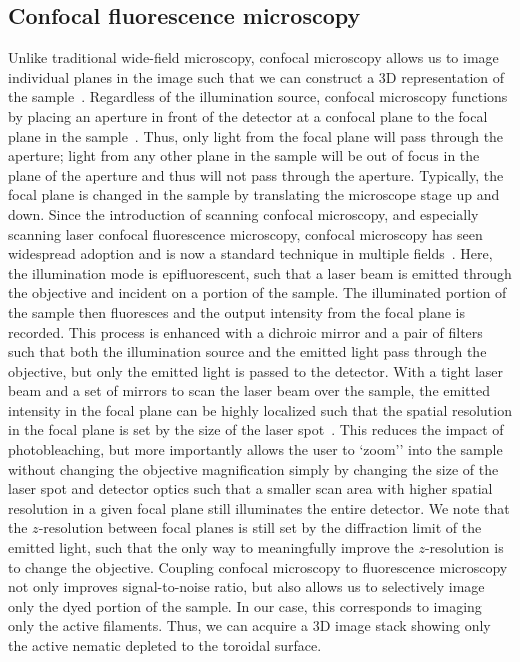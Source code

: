 \subsection{Confocal fluorescence microscopy}
Unlike traditional wide-field microscopy, confocal microscopy allows us to image individual planes in the image such that we can construct a 3D representation of the sample~\cite{RN260}.
Regardless of the illumination source, confocal microscopy functions by placing an aperture in front of the detector at a confocal plane to the focal plane in the sample~\cite{RN259}.
Thus, only light from the focal plane will pass through the aperture; light from any other plane in the sample will be out of focus in the plane of the aperture and thus will not pass through the aperture.
Typically, the focal plane is changed in the sample by translating the microscope stage up and down.
Since the introduction of scanning confocal microscopy, and especially scanning laser confocal fluorescence microscopy, confocal microscopy has seen widespread adoption and is now a standard technique in multiple fields~\cite{RN261,RN262,RN260}.
Here, the illumination mode is epifluorescent, such that a laser beam is emitted through the objective and incident on a portion of the sample.
The illuminated portion of the sample then fluoresces and the output intensity from the focal plane is recorded.
This process is enhanced with a dichroic mirror and a pair of filters such that both the illumination source and the emitted light pass through the objective, but only the emitted light is passed to the detector.
With a tight laser beam and a set of mirrors to scan the laser beam over the sample, the emitted intensity in the focal plane can be highly localized such that the spatial resolution in the focal plane is set by the size of the laser spot~\cite{RN260}.
This reduces the impact of photobleaching, but more importantly allows the user to `zoom'' into the sample without changing the objective magnification simply by changing the size of the laser spot and detector optics such that a smaller scan area with higher spatial resolution in a given focal plane still illuminates the entire detector.
We note that the $z$-resolution between focal planes is still set by the diffraction limit of the emitted light, such that the only way to meaningfully improve the $z$-resolution is to change the objective.
Coupling confocal microscopy to fluorescence microscopy not only improves signal-to-noise ratio, but also allows us to selectively image only the dyed portion of the sample.
In our case, this corresponds to imaging only the active filaments.
Thus, we can acquire a 3D image stack showing only the active nematic depleted to the toroidal surface.


